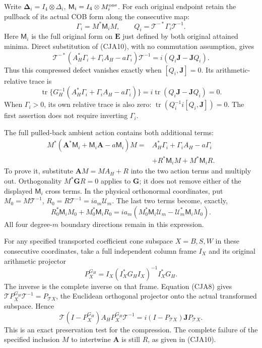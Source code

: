 Write \(\boldsymbol\Delta_i=I_4\otimes\Delta_i\),
\(\mathsf M_i=I_4\otimes M_i^{\rm one}\).
For each original endpoint retain the pullback of its actual COB form
along the consecutive map:
\[
 \Gamma_i=M^*\mathsf M_iM,\qquad
 Q_i=\mathcal T^{-*}\Gamma_i\mathcal T^{-1}.
\]
Here \(\mathsf M_i\) is the full original form on \(\mathbf E\)
just defined by both original attained minima.
Direct substitution of (CJA10), with no commutation assumption, gives
\begin{equation}
 \boxed{\mathcal T^{-*}
 (A_H^*\Gamma_i+\Gamma_iA_H-a\Gamma_i)\mathcal T^{-1}
       =i(Q_i\mathbf J-\mathbf JQ_i).}
 \tag{CJA13}
\end{equation}
Thus this compressed defect vanishes exactly when
\([Q_i,\mathbf J]=0\).
Its arithmetic-relative trace is
\[
 \operatorname{tr}\{G_H^{-1}
 (A_H^*\Gamma_i+\Gamma_iA_H-a\Gamma_i)\}
   =i\operatorname{tr}(Q_i\mathbf J-\mathbf JQ_i)=0 .
\]
When \(\Gamma_i>0\), its own relative trace is also zero:
\(\operatorname{tr}(Q_i^{-1}i[Q_i,\mathbf J])=0\).
The first assertion does not require inverting \(\Gamma_i\).

The full pulled-back ambient action contains both additional terms:
\begin{equation}
 \begin{split}
 M^*(\mathbf A^*\mathsf M_i+\mathsf M_i\mathbf A-a\mathsf M_i)M
 ={}&A_H^*\Gamma_i+\Gamma_iA_H-a\Gamma_i\\
   &+R^*\mathsf M_iM+M^*\mathsf M_iR .
 \end{split}
 \tag{CJA14}
\end{equation}
To prove it, substitute \(\mathbf AM=MA_H+R\) into the two
action terms and multiply out.  Orthogonality
\(M^*\mathbf GR=0\) applies to \(\mathbf G\);
it does not remove either of the displayed \(\mathsf M_i\) cross terms.
In the physical orthonormal coordinates, put
\(M_0=M\mathcal T^{-1}\), \(R_0=R\mathcal T^{-1}=ia_m\mathcal U_m\).
The last two terms become, exactly,
\begin{equation}
 R_0^*\mathsf M_iM_0+M_0^*\mathsf M_iR_0
 =ia_m(M_0^*\mathsf M_i\mathcal U_m
              -\mathcal U_m^*\mathsf M_iM_0).
 \tag{CJA15}
\end{equation}
All four degree-\(m\) boundary directions remain in this expression.

For any specified transported coefficient cone subspace \(X=B,S,W\)
in these consecutive coordinates,
take a full independent column frame \(I_X\) and its original
arithmetic projector
\[
 P_X^{G_H}=I_X(I_X^*G_HI_X)^{-1}I_X^*G_H .
\]
The inverse is the complete inverse on that frame.
Equation (CJA8) gives
\(\mathcal TP_X^{G_H}\mathcal T^{-1}=P_{\mathcal TX}\),
the Euclidean orthogonal projector onto the actual transformed
subspace.  Hence
\begin{equation}
 \mathcal T(I-P_X^{G_H})A_HP_X^{G_H}\mathcal T^{-1}
     =i(I-P_{\mathcal TX})\mathbf JP_{\mathcal TX}.
 \tag{CJA16}
\end{equation}
This is an exact preservation test for the compression.
The complete failure of the specified inclusion \(M\) to intertwine
\(\mathbf A\) is still \(R\), as given in (CJA10).

